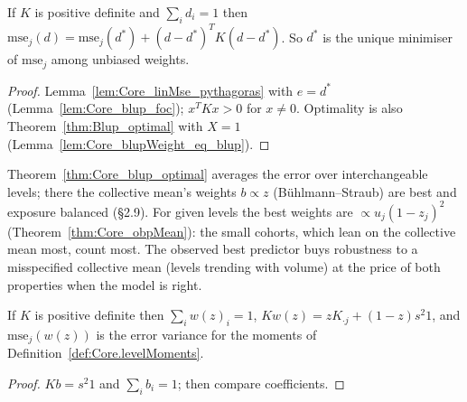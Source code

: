 \begin{theorem}\label{thm:Core_blup_optimal}
  \leanok
  If $K$ is positive definite and $\sum_i d_i = 1$ then
  $\mathrm{mse}_j(d) = \mathrm{mse}_j(d^*) + (d-d^*)^TK(d-d^*)$. So $d^*$ is
  the unique minimiser of $\mathrm{mse}_j$ among unbiased weights.
\end{theorem}
\begin{proof}
  \leanok
  Lemma~\ref{lem:Core_linMse_pythagoras} with $e = d^*$
  (Lemma~\ref{lem:Core_blup_foc}); $x^TKx > 0$ for $x \ne 0$. Optimality is also
  Theorem~\ref{thm:Blup_optimal} with $X = 1$ (Lemma~\ref{lem:Core_blupWeight_eq_blup}).
\end{proof}

\begin{remark}\label{rem:obp_weights}
  Theorem~\ref{thm:Core_blup_optimal} averages the error over interchangeable levels; there the
  collective mean's weights $b \propto z$ (Bühlmann--Straub) are best and exposure balanced
  (\S2.9). For given levels the best weights are $\propto u_j(1-z_j)^2$
  (Theorem~\ref{thm:Core_obpMean}): the small cohorts, which lean on the collective mean most,
  count most. The observed best predictor buys robustness to a misspecified collective mean
  (levels trending with volume) at the price of both properties when the model is right.
\end{remark}

\begin{lemma}\label{lem:Core_blendWeight}
  \leanok
  If $K$ is positive definite then $\sum_i w(z)_i = 1$,
  $Kw(z) = zK_{\cdot j} + (1-z)s^2 1$, and $\mathrm{mse}_j(w(z))$ is the error
  variance  for the moments of Definition~\ref{def:Core.levelMoments}.
\end{lemma}
\begin{proof}
  \leanok
  $Kb = s^2 1$ and $\sum_i b_i = 1$; then compare coefficients.
\end{proof}

